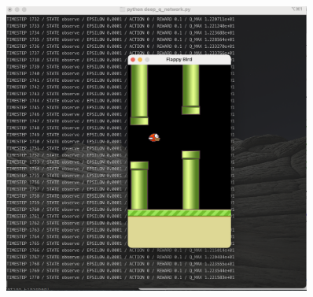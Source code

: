 \documentclass[a4paper, 11pt]{article}
\begin{document}
\begin{figure}[ht]
\centering
\includegraphics[width=0.9\textwidth]{Pic/1.png}
\end{figure}
\end{document}
